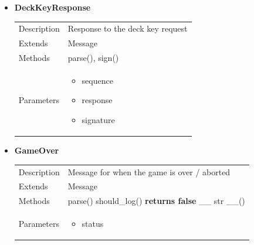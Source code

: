 \documentclass[11pt]{article}
\begin{document}
\begin{itemize}
\item
  \textbf{DeckKeyResponse}

	
  \begin{longtable}[]{@{}ll@{}}
  \toprule
  \endhead
  \begin{minipage}[t]{0.40\columnwidth}\raggedright
  Description\strut
  \end{minipage} & \begin{minipage}[t]{0.54\columnwidth}\raggedright
  Response to the deck key request \strut
  \end{minipage}\tabularnewline
  \begin{minipage}[t]{0.40\columnwidth}\raggedright
  Extends\strut
  \end{minipage} & \begin{minipage}[t]{0.54\columnwidth}\raggedright
  Message\strut
  \end{minipage}\tabularnewline
  \begin{minipage}[t]{0.40\columnwidth}\raggedright
  Methods\strut
  \end{minipage} & \begin{minipage}[t]{0.54\columnwidth}\raggedright
  parse(), sign()\strut
  \end{minipage}\tabularnewline
  \begin{minipage}[t]{0.40\columnwidth}\raggedright
  Parameters\strut
  \end{minipage} & \begin{minipage}[t]{0.54\columnwidth}\raggedright
  \begin{itemize}
  	\item sequence
  	\item response
  	\item signature
  \end{itemize}
  \end{minipage}\tabularnewline
  \bottomrule
  \end{longtable}
	
\item
  \textbf{GameOver}

  \begin{longtable}[]{@{}ll@{}}
  \toprule
  \endhead
  Description & Message for when the game is over /
  aborted\tabularnewline
  Extends & Message\tabularnewline
  Methods & parse() should\_log() \textbf{returns false} \_\_ str
  \_\_()\tabularnewline
  \begin{minipage}[t]{0.40\columnwidth}\raggedright
  Parameters\strut
  \end{minipage} & \begin{minipage}[t]{0.54\columnwidth}\raggedright
  \begin{itemize}
  	\item status
  \end{itemize}\strut
  \end{minipage}\tabularnewline
  \bottomrule
  \end{longtable}

\end{itemize}
\end{document}

